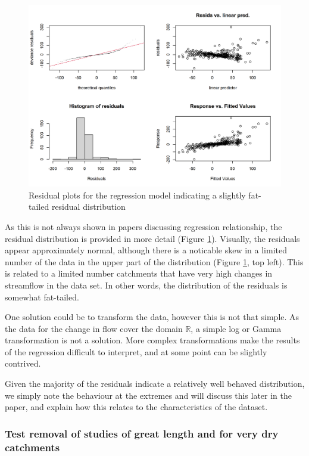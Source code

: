 \documentclass[]{elsarticle} %
\begin{document}
\begin{figure}
\includegraphics[width=0.9\linewidth]{residual_plot_model_all} \caption{Residual plots for the regression model indicating a slightly fat-tailed residual distribution}\label{fig:gamcheckmodelall}
\end{figure}

As this is not always shown in papers discussing regression relationship, the residual distribution is provided in more detail (Figure \ref{fig:gamcheckmodelall}). Visually, the residuals appear approximately normal, although there is a noticable skew in a limited number of the data in the upper part of the distribution (Figure \ref{fig:gamcheckmodelall}, top left). This is related to a limited number catchments that have very high changes in streamflow in the data set. In other words, the distribution of the residuals is somewhat fat-tailed.

One solution could be to transform the data, however this is not that simple. As the data for the change in flow cover the domain \(\mathbb{R}\), a simple log or Gamma transformation is not a solution. More complex transformations make the results of the regression difficult to interpret, and at some point can be slightly contrived.

Given the majority of the residuals indicate a relatively well behaved distribution, we simply note the behaviour at the extremes and will discuss this later in the paper, and explain how this relates to the characteristics of the dataset.

\hypertarget{test-removal-of-studies-of-great-length-and-for-very-dry-catchments}{%
\subsubsection{Test removal of studies of great length and for very dry catchments}\label{test-removal-of-studies-of-great-length-and-for-very-dry-catchments}}
\end{document}
